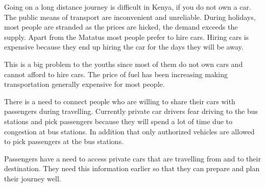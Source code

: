 Going on a long distance journey is difficult in Kenya, if you do not own a car. The public means of transport are inconvenient and unreliable. During holidays, most people are stranded as the prices are hicked, the demand exceeds the supply. Apart from the Matatus most people prefer to hire cars. Hiring cars is expensive because they end up hiring the car for the days they will be away.

This is a big problem to the youths since most of them do not own cars and cannot afford to hire cars. The price of fuel has been increasing making transportation generally expensive for most people.

There is a need to connect people who are willing to share their cars with passengers during travelling. Currently private car drivers fear driving to the bus stations and pick passengers because they will spend a lot of time due to congestion at bus stations. In addition that only authorized vehicles are allowed to pick passengers at the bus stations.

Passengers have a need to access private cars that are travelling from and to their destination. They need this information earlier so that they can prepare and plan their journey well.